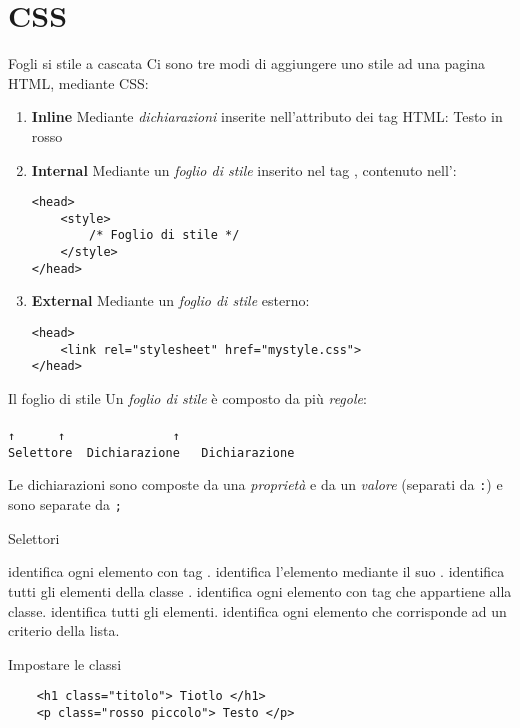 \section{CSS}
\begin{frame}[fragile]{Fogli si stile a cascata}\transfade\centering
  Ci sono tre modi di aggiungere uno stile ad una pagina HTML, mediante CSS:
  \begin{enumerate}[<+(1)->]
    \item \textbf{Inline} Mediante \emph{dichiarazioni} inserite nell'attributo  dei tag HTML:
     {\color{red}Testo in rosso}
    \item \textbf{Internal} Mediante un \emph{foglio di stile} inserito nel tag , contenuto nell':
    \begin{verbatim}
<head>
    <style>
        /* Foglio di stile */
    </style>
</head>
    \end{verbatim}
    \item \textbf{External} Mediante un \emph{foglio di stile} esterno:
    \begin{verbatim}
<head>
    <link rel="stylesheet" href="mystyle.css">
</head>
    \end{verbatim}
  \end{enumerate}
\end{frame}

\begin{frame}[fragile]{Il foglio di stile}\transfade\centering
  Un \emph{foglio di stile} è composto da più \emph{regole}:\\\medskip
     \\
      \texttt{↑~~~~~~↑~~~~~~~~~~~~~~~↑~~~~~~}\\
\texttt{Selettore~~Dichiarazione~~~Dichiarazione~~}\par\bigskip
  Le dichiarazioni sono composte da una \emph{proprietà} e da un \emph{valore} (separati da \texttt{:}) e sono separate da \texttt{;}\\
\end{frame}

\begin{frame}{Selettori}\transfade\centering
  \begin{description}[<+->]
    \itemtt[p] identifica ogni elemento con tag .
    \itemtt[\#id] identifica l'elemento mediante il suo .
    \itemtt[.class] identifica tutti gli elementi della classe .
    \itemtt[p.class] identifica ogni elemento con tag  che appartiene alla classe.
    \itemtt[*] identifica tutti gli elementi.
     identifica ogni elemento che corrisponde ad un criterio della lista.
  \end{description}
\end{frame}

\begin{frame}[fragile]{Impostare le classi}\transfade\centering
  \begin{verbatim}
    <h1 class="titolo"> Tiotlo </h1>
    <p class="rosso piccolo"> Testo </p>
  \end{verbatim}
\end{frame}